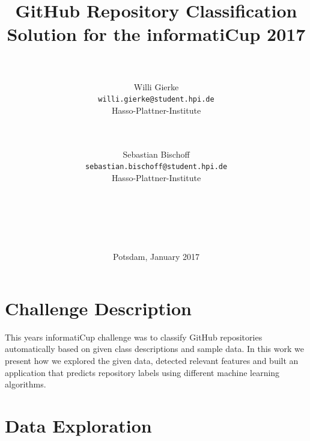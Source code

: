 \documentclass[%
a4paper,
DIV12,
2.5headlines,
bigheadings,
titlepage,
openbib,
]{scrartcl}
\begin{document}
\providecommand{\tightlist}{%
  \setlength{\itemsep}{0pt}\setlength{\parskip}{0pt}}

\DeclareRobustCommand{\desiredTitle}{
  GitHub Repository Classification\\\normalsize{Solution for the informatiCup 2017}
}

\DeclareRobustCommand{\desiredAuthor}{
  \\\\Willi Gierke\\\texttt{willi.gierke@student.hpi.de}\\Hasso-Plattner-Institute \and \\\\Sebastian Bischoff\\\texttt{sebastian.bischoff@student.hpi.de}\\Hasso-Plattner-Institute\\\\\\\\\\\\
}

\begin{titlepage}
\begin{center}
   \title{\desiredTitle}
   \author{\desiredAuthor}
   \date{Potsdam, January 2017}
   \maketitle
\end{center}
\end{titlepage}

\listoftodos
\pagebreak

\tableofcontents
\pagebreak

\section{Challenge Description}\label{challenge-description}

This years informatiCup challenge was to classify GitHub repositories automatically based on given class descriptions and sample data.
In this work we present how we explored the given data, detected relevant features and built an application that predicts repository labels using different machine learning algorithms.

\section{Data Exploration}\label{data-exploration}
\end{document}
